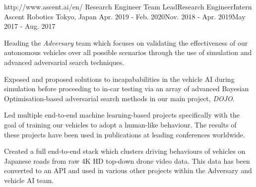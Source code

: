 

\begin{cventries}

  \cventry
    {http://www.ascent.ai/en/}
    {Research Engineer Team Lead\linebreak Research Engineer\linebreak Intern} %
    {Ascent Robotics} %
    {Tokyo, Japan} %
    {Apr. 2019 - Feb. 2020\linebreak Nov. 2018 - Apr. 2019\linebreak May 2017 - Aug. 2017} %
    {
      \begin{cvitems} %
        \item {Heading the \emph{Adversary} team which focuses on validating the effectiveness of our autonomous vehicles over all possible scenarios through the use of simulation and advanced adversarial search techniques.}
        \item {Exposed and proposed solutions to incapababilities in the vehicle AI during simulation before proceeding to in-car testing via an array of advanced Bayesian Optimisation-based adversarial search methods in our main project, \emph{DOJO}.}
        \item {Led multiple end-to-end machine learning-based projects specifically with the goal of training our vehicles to adopt a human-like behaviour. The results of these projects have been used in publications at leading conferences worldwide.}
        \item {Created a full end-to-end stack which clusters driving behaviours of vehicles on Japanese roads from raw 4K HD top-down drone video data. This data has been converted to an API and used in various other projects within the Adversary and vehicle AI team.}
      \end{cvitems}
    }


\end{cventries}

